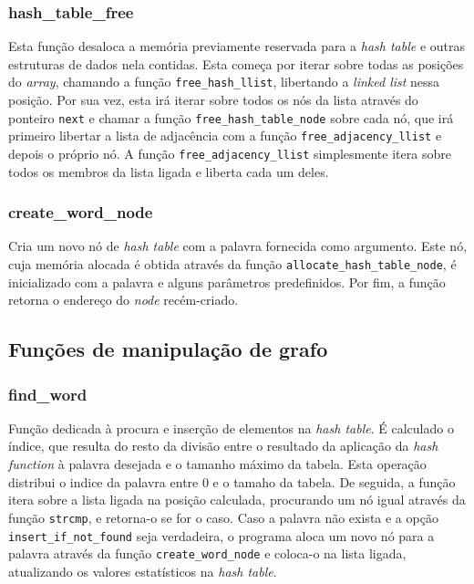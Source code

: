 \documentclass[portuguese,11pt,a4paper,titlepage]{article}
\newcommand{\foreign}[1]{\textit{#1}}
\begin{document}
\subsubsection{hash\_table\_free}
Esta função desaloca a memória previamente reservada para a \foreign{hash table} e outras
estruturas de dados nela contidas. Esta começa por iterar sobre todas as posições do \foreign{array}, chamando a função \verb|free_hash_llist|, libertando a \foreign{linked list} nessa posição. Por sua vez, esta irá iterar sobre todos os nós da lista através
do ponteiro \verb|next| e chamar a função \verb|free_hash_table_node| sobre cada nó, que irá primeiro libertar a lista de adjacência com a função \verb|free_adjacency_llist| e depois o próprio nó. A função \verb|free_adjacency_llist| simplesmente itera sobre todos
os membros da lista ligada e liberta cada um deles.

\subsubsection{create\_word\_node}
Cria um novo nó de \textit{hash table} com a palavra fornecida como argumento. Este nó, cuja memória alocada é obtida através da função \verb|allocate_hash_table_node|, é inicializado com a palavra e alguns parâmetros predefinidos. Por fim, a função retorna o endereço do \textit{node} recém-criado.

\subsection{Funções de manipulação de grafo}

\subsubsection{find\_word}
Função dedicada à procura e inserção de elementos na \foreign{hash table}. 
É calculado o índice, que resulta do resto da divisão entre o resultado da aplicação da \foreign{hash function} à palavra desejada e o tamanho máximo da tabela. Esta operação distribui o indice da palavra entre 0 e o tamaho da tabela. De seguida, a função itera sobre a lista ligada na posição calculada, procurando um nó igual através da função \verb|strcmp|, e retorna-o se for o caso.
Caso a palavra não exista e a opção \verb|insert_if_not_found| seja verdadeira, o programa aloca um novo nó para a palavra através da função \verb|create_word_node| e coloca-o na lista ligada, atualizando os valores estatísticos na \foreign{hash table}.
\end{document}
